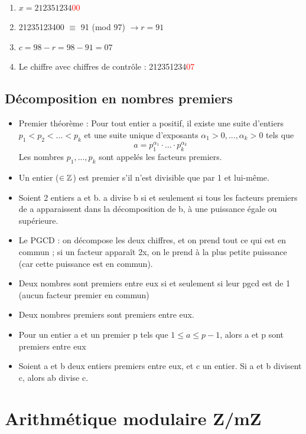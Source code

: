 \documentclass[11pt,a4paper]{article}
\renewcommand{\)}{\right)}
\renewcommand{\(}{\left(}
\begin{document}
\begin{exemple}[0.55]
	~
	\begin{enumerate}
		\item 	$x = 212351234$\textcolor{red}{00}
		\item 	21235123400 $\equiv$ 91 (mod 97) $\to r = 91$
		\item 	$c = 98-r = 98-91 = 07$
		\item 	Le chiffre avec chiffres de contrôle : 212351234\textcolor{red}{07}
	\end{enumerate}
\end{exemple}
\subsection{Décomposition en nombres premiers}
\begin{itemize}
	\item 	Premier théorème : Pour tout entier a positif, il existe une suite d'entiers $p_1<p_2<...<p_k$ et une suite unique d'exposants $\alpha_1>0,...,\alpha_k>0$ tels que
			\begin{equation*}
				a = p_1^{\alpha_1}\cdot...\cdot p_k^{\alpha_k}
			\end{equation*}
			Les nombres $p_1,...,p_k$ sont appelés les facteurs premiers.
	\item 	Un entier ($\in \mathbb{Z}$) est premier s'il n'est divisible que par 1 et lui-même.
	\item 	Soient 2 entiers a et b. a divise b si et seulement si tous les facteurs premiers de a apparaissent dans la décomposition de b, à une puissance égale ou supérieure.
	\item 	Le PGCD : on décompose les deux chiffres, et on prend tout ce qui est en commun ; si un facteur apparaît 2x, on le prend à la plus petite puissance (car cette puissance est en commun).
	\item 	Deux nombres sont premiers entre eux si et seulement si leur pgcd est de 1 (aucun facteur premier en commun)
	\item 	Deux nombres premiers sont premiers entre eux.
	\item 	Pour un entier a et un premier p tels que $1\leq a \leq p-1$, alors a et p sont premiers entre eux
	\item 	Soient a et b deux entiers premiers entre eux, et c un entier. Si a et b divisent c, alors ab divise c.
\end{itemize}

\section{Arithmétique modulaire Z/mZ}
\end{document}
